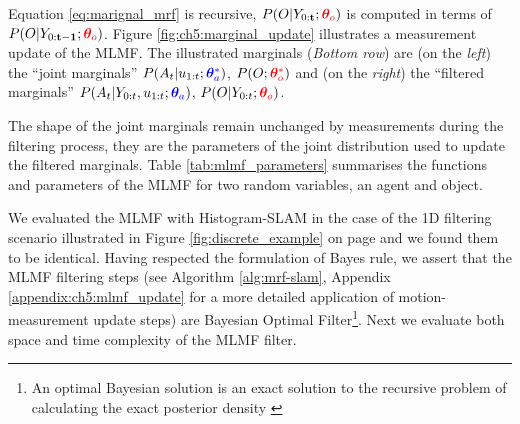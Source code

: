 Equation \ref{eq:marignal_mrf} is recursive, $P(O|Y_{0:\mathbf{t}};\mathcolor{red}{\ThO})$ is computed in terms of $P(O|Y_{0:\mathbf{t-1}};\mathcolor{red}{\ThO})$. 
Figure \ref{fig:ch5:marginal_update} illustrates a measurement update of the MLMF.  The illustrated marginals (\textit{Bottom row}) are 
(on the \textit{left}) the ``joint marginals'' $P(A_t|u_{1:t};\mathcolor{blue}{\ThAs})$, $P(O;\mathcolor{red}{\ThOs})$ and (on the \textit{right}) the ``filtered marginals''
$P(A_t|Y_{0:t},u_{1:t};\mathcolor{blue}{\ThA})$, $P(O|Y_{0:t};\mathcolor{red}{\ThO})$. 


The shape of the joint marginals remain unchanged by measurements during the filtering process, they are the parameters of the joint distribution used to update the filtered marginals. 
Table \ref{tab:mlmf_parameters} summarises the functions and parameters of the MLMF for two random variables, an agent and object.

\begin{table}[h]
\centering
{}
\caption{MLMF functions with associated parameters. The marginal parameters are the discretisation of the 
state space $\boldsymbol{\theta} \in \mathbb{R}^N$, $\boldsymbol{\theta}^{(s)}$ correspond to the probability being in state $s$.}
\label{tab:mlmf_parameters}
\end{table}

We evaluated the MLMF with Histogram-SLAM in the case of the 1D filtering scenario
illustrated in Figure \ref{fig:discrete_example} on page \pageref{fig:discrete_example} and we found them to be identical. Having respected the formulation of Bayes rule, we
assert that the MLMF filtering steps (see  Algorithm \ref{alg:mrf-slam}, Appendix \ref{appendix:ch5:mlmf_update} for a more detailed application of motion-measurement update steps) are 
Bayesian Optimal Filter\footnote{An optimal Bayesian solution is an exact solution to the recursive problem of calculating the exact posterior density \cite{PF_tutorial_2002}}. 
Next we evaluate both space and time complexity of the MLMF filter.

